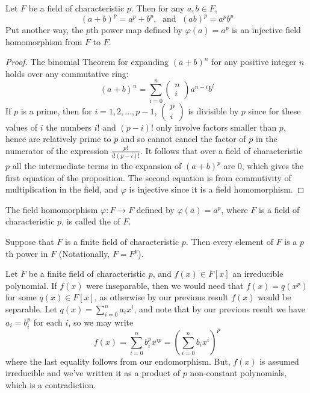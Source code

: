 \documentclass[12pt, a4paper, oneside, openright, titlepage]{book}
\begin{document}
\begin{prop}
    Let $F$ be a field of characteristic $p$. Then for any $a,b \in F$, \begin{equation*}
        (a+b)^p = a^p+b^p,\; \text{ and }\; (ab)^p = a^pb^p
    \end{equation*}
    Put another way, the $p$th power map defined by $\varphi(a) = a^p$ is an injective field homomorphism from $F$ to $F$.
\end{prop}
\begin{proof}
    The binomial Theorem for expanding $(a+b)^n$ for any positive integer $n$ holds over any commutative ring: \begin{equation*}
        (a+b)^n=\sum_{i=0}^n\begin{pmatrix} n \\ i\end{pmatrix}a^{n-i}b^i
    \end{equation*}
    If $p$ is a prime, then for $i = 1,2,...,p-1$, $\begin{pmatrix} p \\ i\end{pmatrix}$ is divisible by $p$ since for these values of $i$ the numbers $i!$ and $(p-i)!$ only involve factors smaller than $p$, hence are relatively prime to $p$ and so cannot cancel the factor of $p$ in the numerator of the expression $\frac{p!}{i!(p-i)!}$. It follows that over a field of characteristic $p$ all the intermediate terms in the expansion of $(a+b)^p$ are $0$, which gives the first equation of the proposition. The second equation is from commutivity of multiplication in the field, and $\varphi$ is injective since it is a field homomorphism.
\end{proof}


\begin{defn}
    The field homomorphism $\varphi:F\rightarrow F$ defined by $\varphi(a) = a^p$, where $F$ is a field of characteristic $p$, is called the  of $F$.
\end{defn}

\begin{cor}
    Suppose that $F$ is a finite field of characteristic $p$. Then every element of $F$ is a $p$th power in $F$ (Notationally, $F = F^p$).
\end{cor}


Let $F$ be a finite field of characteristic $p$, and $f(x) \in F[x]$ an irreducible polynomial. If $f(x)$ were inseparable, then we would need that $f(x) = q(x^p)$ for some $q(x) \in F[x]$, as otherwise by our previous result $f(x)$ would be separable. Let $q(x) = \sum_{i=0}^na_ix^i$, and note that by our previous result we have $a_i = b_i^p$ for each $i$, so we may write \begin{equation*}
    f(x) = \sum_{i=0}^nb_i^px^{ip} = \left(\sum_{i=0}^nb_ix^i\right)^p
\end{equation*}
where the last equality follows from our endomorphism. But, $f(x)$ is assumed irreducible and we've written it as a product of $p$ non-constant polynomials, which is a contradiction. 
\end{document}
